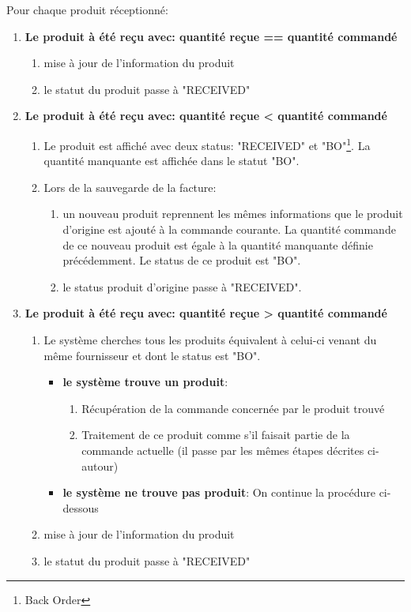 Pour chaque produit réceptionné:
\begin{enumerate}

  \item \textbf{Le produit à été reçu avec: quantité reçue == quantité commandé}
  \begin{enumerate}
    \item mise à jour de l'information du produit
    \item le statut du produit passe à "RECEIVED"
  \end{enumerate}

  \newpara
  \item \textbf{Le produit à été reçu avec: quantité reçue < quantité commandé}
  \begin{enumerate}
    \item Le produit est affiché avec deux status: "RECEIVED" et "BO"\footnote{Back Order}. La quantité manquante est affichée dans le statut "BO".
    \newpage
    \item Lors de la sauvegarde de la facture:
    \begin{enumerate}
      \item un nouveau produit reprennent les mêmes informations que le produit d'origine est ajouté à la commande courante. La quantité commande de ce nouveau produit est égale à la quantité manquante définie précédemment. Le status de ce produit est "BO".
      \item le status produit d'origine passe à "RECEIVED".
    \end{enumerate}
  \end{enumerate}
  
  \newpara
  \item \textbf{Le produit à été reçu avec: quantité reçue > quantité commandé}
  \begin{enumerate}
    \item Le système cherches tous les produits équivalent à celui-ci venant du même fournisseur et dont le status est "BO". 
    \begin{itemize}
      \item \textbf{le système trouve un produit}: 
      \begin{enumerate}
        \item Récupération de la commande concernée par le produit trouvé
        \item Traitement de ce produit comme s'il faisait partie de la commande actuelle (il passe par les mêmes étapes décrites ci-autour)
      \end{enumerate}
      \item \textbf{le système ne trouve pas produit}: On continue la procédure ci-dessous
    \end{itemize}
    \item mise à jour de l'information du produit
    \item le statut du produit passe à "RECEIVED"
  \end{enumerate}
  

\end{enumerate}
